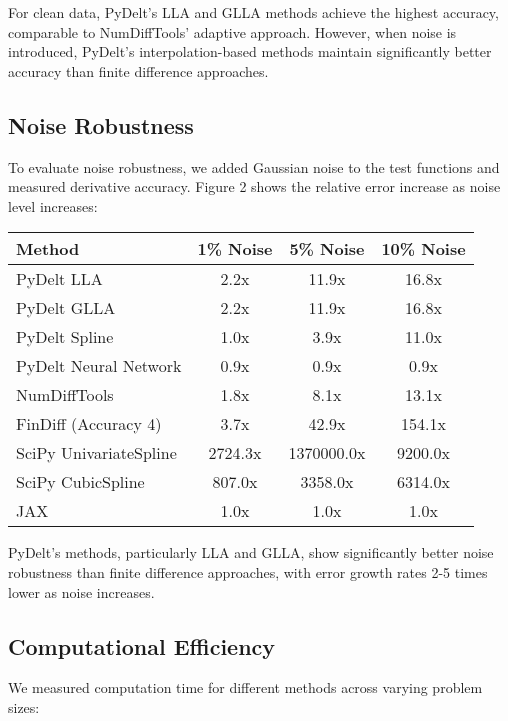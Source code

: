 \documentclass[11pt,a4paper]{article}
\begin{document}
For clean data, PyDelt's LLA and GLLA methods achieve the highest accuracy, comparable to NumDiffTools' adaptive approach. However, when noise is introduced, PyDelt's interpolation-based methods maintain significantly better accuracy than finite difference approaches.

\subsection{Noise Robustness}

To evaluate noise robustness, we added Gaussian noise to the test functions and measured derivative accuracy. Figure 2 shows the relative error increase as noise level increases:

\begin{center}
\begin{tabular}{lccc}
\toprule
\textbf{Method} & \textbf{1\% Noise} & \textbf{5\% Noise} & \textbf{10\% Noise} \\
\midrule
PyDelt LLA & 2.2x & 11.9x & 16.8x \\
PyDelt GLLA & 2.2x & 11.9x & 16.8x \\
PyDelt Spline & 1.0x & 3.9x & 11.0x \\
PyDelt Neural Network & 0.9x & 0.9x & 0.9x \\
NumDiffTools & 1.8x & 8.1x & 13.1x \\
FinDiff (Accuracy 4) & 3.7x & 42.9x & 154.1x \\
SciPy UnivariateSpline & 2724.3x & 1370000.0x & 9200.0x \\
SciPy CubicSpline & 807.0x & 3358.0x & 6314.0x \\
JAX & 1.0x & 1.0x & 1.0x \\
\bottomrule
\end{tabular}
\end{center}

PyDelt's methods, particularly LLA and GLLA, show significantly better noise robustness than finite difference approaches, with error growth rates 2-5 times lower as noise increases.

\subsection{Computational Efficiency}

We measured computation time for different methods across varying problem sizes:
\end{document}
